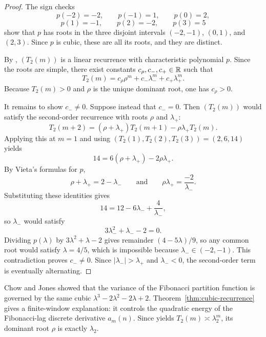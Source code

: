 \begin{proof}
The sign checks
\[
  p(-2)=-2,\qquad p(-1)=1,\qquad p(0)=2,
\]
\[
  p(1)=-1,\qquad p(2)=-2,\qquad p(3)=5
\]
show that \(p\) has roots in the three disjoint intervals
\((-2,-1)\), \((0,1)\), and \((2,3)\).  Since \(p\) is cubic, these are all
its roots, and they are distinct.

By , \((T_2(m))\) is a linear recurrence with
characteristic polynomial \(p\).  Since the roots are simple, there exist
constants \(c_\rho,c_-,c_+\in\mathbb{R}\) such that
\[
  T_2(m)=c_\rho\rho^m+c_-\lambda_-^m+c_+\lambda_+^m.
\]
Because \(T_2(m)>0\) and \(\rho\) is the unique dominant root, one has
\(c_\rho>0\).

It remains to show \(c_-\neq 0\).  Suppose instead that \(c_-=0\).  Then
\((T_2(m))\) would satisfy the second-order recurrence with roots \(\rho\) and
\(\lambda_+\):
\[
  T_2(m+2)=(\rho+\lambda_+)T_2(m+1)-\rho\lambda_+T_2(m).
\]
Applying this at \(m=1\) and using \((T_2(1),T_2(2),T_2(3))=(2,6,14)\) yields
\[
  14=6(\rho+\lambda_+)-2\rho\lambda_+.
\]
By Vieta's formulas for \(p\),
\[
  \rho+\lambda_+=2-\lambda_-
  \qquad\text{and}\qquad
  \rho\lambda_+=\frac{-2}{\lambda_-}.
\]
Substituting these identities gives
\[
  14=12-6\lambda_-+\frac{4}{\lambda_-},
\]
so \(\lambda_-\) would satisfy
\[
  3\lambda_-^2+\lambda_--2=0.
\]
Dividing \(p(\lambda)\) by \(3\lambda^2+\lambda-2\) gives remainder
\((4-5\lambda)/9\), so any common root would satisfy \(\lambda=4/5\), which is
impossible because \(\lambda_-\in(-2,-1)\).  This contradiction proves
\(c_-\neq 0\).  Since \(|\lambda_-|>\lambda_+\) and \(\lambda_-<0\), the
second-order term is eventually alternating.
\end{proof}

\begin{remark}
\label{rem:chow-jones}
Chow and Jones \cite{ChowJones2024} showed that the variance of the Fibonacci
partition function is governed by the same cubic
\(\lambda^3-2\lambda^2-2\lambda+2\).  Theorem~\ref{thm:cubic-recurrence} gives
a finite-window explanation: it controls the quadratic energy of the
Fibonacci-lag discrete derivative \(a_m(n)\).  Since
 yields \(T_2(m)\asymp \lambda_2^m\), its dominant
root \(\rho\) is exactly \(\lambda_2\).
\end{remark}
